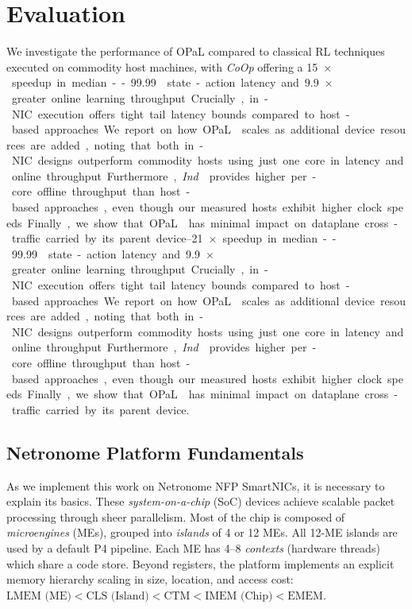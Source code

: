 \documentclass[
sigconf,natbib=false
]{acmart}
\newcommand{\approachshort}{OPaL}
\newcommand{\Coopfw}{\emph{CoOp}}
\newcommand{\Indfw}{\emph{Ind}}
\begin{document}
\section{Evaluation}\label{sec:evaluation}
We investigate the performance of \approachshort{} compared to classical RL techniques executed on commodity host machines, with \Coopfw{} offering a \SIrange{15}{21}{$\times$} speedup in median--\num{99.99} state-action latency and \SI{9.9}{$\times$} greater online learning throughput.
Crucially, in-NIC execution offers tight tail latency bounds compared to host-based approaches.
We report on how \approachshort{} scales as additional device resources are added, noting that both in-NIC designs outperform commodity hosts using just one core in latency and online throughput.
Furthermore, \Indfw{} provides higher per-core offline throughput than host-based approaches, even though our measured hosts exhibit higher clock speeds.
Finally, we show that \approachshort{} has minimal impact on dataplane cross-traffic carried by its parent device.

\subsection{Netronome Platform Fundamentals}\label{sec:netronome-platform-fundamentals}
As we implement this work on Netronome NFP SmartNICs, it is necessary to explain its basics.
These \emph{system-on-a-chip} (SoC) devices achieve scalable packet processing through sheer parallelism.
Most of the chip is composed of \emph{microengines} (MEs), grouped into \emph{islands} of 4 or 12 MEs.
All 12-ME islands are used by a default P4 pipeline.
Each ME has \numrange{4}{8} \emph{contexts} (hardware threads) which share a code store.
Beyond registers, the platform implements an explicit memory hierarchy scaling in size, location, and access cost:
$\text{LMEM (ME)} < \text{CLS (Island)} < \text{CTM} < \text{IMEM (Chip)} < \text{EMEM}$.
\end{document}
